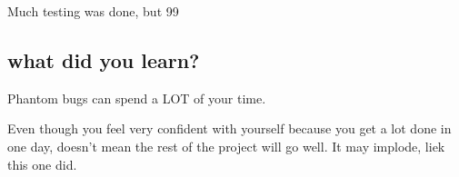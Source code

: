 \documentclass[letterpaper,10pt,titlepage]{article}
\begin{document}
Much testing was done, but 99%

\subsection{what did you learn?}

Phantom bugs can spend a LOT of your time.

Even though you feel very confident with yourself because you get a lot done in one day, doesn't mean the rest of the project will go well.  It may implode, liek this one did.
\end{document}
